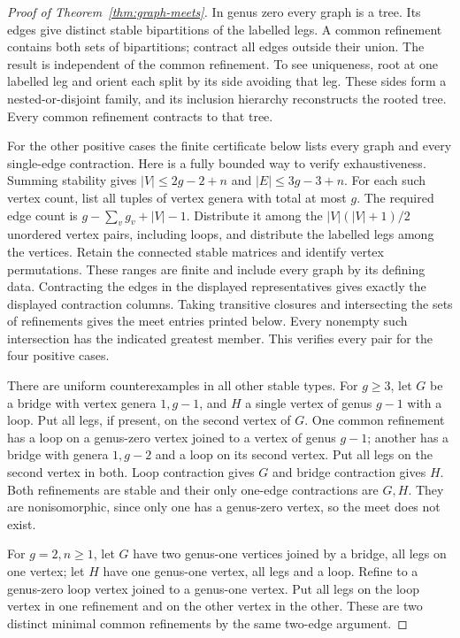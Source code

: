 \documentclass[11pt,a4paper]{article}
\theoremstyle{definition}
\begin{document}
\begin{proof}[Proof of Theorem~\ref{thm:graph-meets}]
In genus zero every graph is a tree. Its edges give distinct stable
bipartitions of the labelled legs. A common refinement contains both
sets of bipartitions; contract all edges outside their union. The
result is independent of the common refinement. To see uniqueness,
root at one labelled leg and orient each split by its side avoiding
that leg. These sides form a nested-or-disjoint family, and its
inclusion hierarchy reconstructs the rooted tree. Every common
refinement contracts to that tree.

For the other positive cases the finite certificate below lists every
graph and every single-edge contraction. Here is a fully bounded
way to verify exhaustiveness. Summing stability gives
$|V|\leq2g-2+n$ and $|E|\leq3g-3+n$. For each such vertex count,
list all tuples of vertex genera with total at most $g$. The required
edge count is $g-\sum_vg_v+|V|-1$. Distribute it among the
$|V|(|V|+1)/2$ unordered vertex pairs, including loops, and distribute
the labelled legs among the vertices. Retain the connected stable
matrices and identify vertex permutations. These ranges are finite
and include every graph by its defining data. Contracting the edges
in the displayed representatives gives exactly the displayed
contraction columns. Taking transitive closures and intersecting the
sets of refinements gives the meet entries printed below. Every
nonempty such intersection has the indicated greatest member.
This verifies every pair for the four positive cases.

There are uniform counterexamples in all other stable types. For
$g\geq3$, let $G$ be a bridge with vertex genera $1,g-1$, and $H$
a single vertex of genus $g-1$ with a loop. Put all legs, if present,
on the second vertex of $G$. One common refinement has a loop on a
genus-zero vertex joined to a vertex of genus $g-1$; another has a
bridge with genera $1,g-2$ and a loop on its second vertex. Put all
legs on the second vertex in both. Loop contraction gives $G$ and
bridge contraction gives $H$. Both refinements are stable and their
only one-edge contractions are $G,H$. They are nonisomorphic, since
only one has a genus-zero vertex, so the meet does not exist.

For $g=2,n\geq1$, let $G$ have two genus-one vertices joined by a
bridge, all legs on one vertex; let $H$ have one genus-one vertex,
all legs and a loop. Refine to a genus-zero loop vertex joined to a
genus-one vertex. Put all legs on the loop vertex in one refinement
and on the other vertex in the other. These are two distinct minimal
common refinements by the same two-edge argument.


\end{proof}
\end{document}
